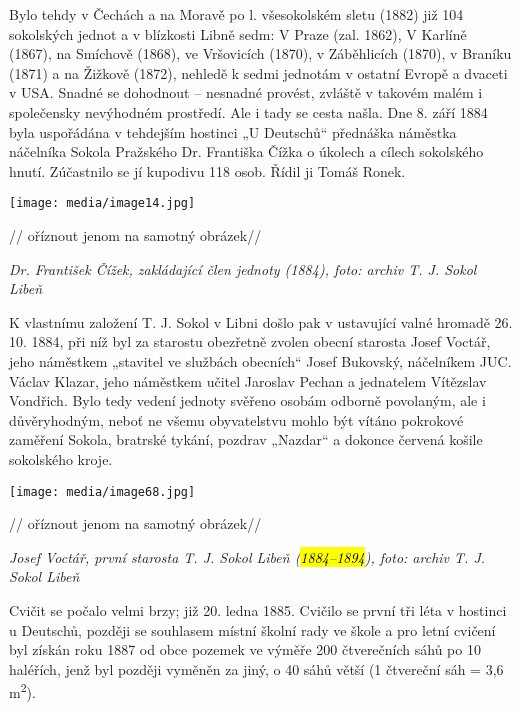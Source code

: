 Bylo tehdy v Čechách a na Moravě po l. všesokolském sletu (1882) již 104
sokolských jednot a v blízkosti Libně sedm: V Praze (zal. 1862), V
Karlíně (1867), na Smíchově (1868), ve Vršovicích (1870), v Záběhlicích
(1870), v Braníku (1871) a na Žižkově (1872), nehledě k sedmi jednotám v
ostatní Evropě a dvaceti v USA. Snadné se dohodnout -- nesnadné provést,
zvláště v takovém malém i společensky nevýhodném prostředí. Ale i tady
se cesta našla. Dne 8. září 1884 byla uspořádána v tehdejším hostinci „U
Deutschů`` přednáška náměstka náčelníka Sokola Pražského Dr. Františka
Čížka o úkolech a cílech sokolského hnutí. Zúčastnilo se jí kupodivu 118
osob. Řídil ji Tomáš Ronek.

\texttt{[image: media/image14.jpg]}

// oříznout jenom na samotný obrázek//

\emph{Dr. František Čížek, zakládající člen jednoty (1884), foto: archiv
T. J. Sokol Libeň}

K vlastnímu založení T. J. Sokol v Libni došlo pak v ustavující valné
hromadě 26. 10. 1884, při níž byl za starostu obezřetně zvolen obecní
starosta Josef Voctář, jeho náměstkem „stavitel ve službách obecních``
Josef Bukovský, náčelníkem JUC. Václav Klazar, jeho náměstkem učitel
Jaroslav Pechan a jednatelem Vítězslav Vondřich. Bylo tedy vedení
jednoty svěřeno osobám odborně povolaným, ale i důvěryhodným, neboť ne
všemu obyvatelstvu mohlo být vítáno pokrokové zaměření Sokola, bratrské
tykání, pozdrav „Nazdar`` a dokonce červená košile sokolského kroje.

\texttt{[image: media/image68.jpg]}

// oříznout jenom na samotný obrázek//

\emph{Josef Voctář, první starosta T. J. Sokol Libeň (\hl{1884--⁠⁠⁠⁠⁠⁠1894}),
foto: archiv T. J. Sokol Libeň}

Cvičit se počalo velmi brzy; již 20. ledna 1885. Cvičilo se první tři
léta v hostinci u Deutschů, později se souhlasem místní školní rady ve
škole a pro letní cvičení byl získán roku 1887 od obce pozemek ve výměře
200 čtverečních sáhů po 10 haléřích, jenž byl později vyměněn za jiný, o
40 sáhů větší (1 čtvereční sáh = 3,6 m\textsuperscript{2}).

